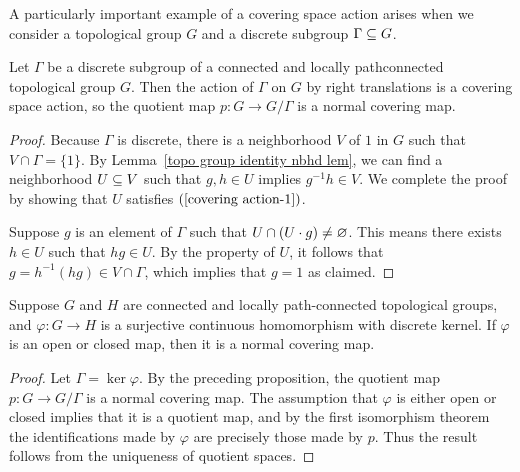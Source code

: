 A particularly important example of a covering space action arises when we consider a topological group $G$ and a discrete subgroup $\Gamma\subseteq G$.
\begin{proposition}
Let $\Gamma$ be a discrete subgroup of a connected and locally pathconnected topological group $G$. Then the action of $\Gamma$ on $G$ by right translations is a covering space action, so the quotient map $p:G\to G/\Gamma$ is a normal covering map.
\end{proposition}
\begin{proof}
Because $\Gamma$ is discrete, there is a neighborhood $V$ of $1$ in $G$ 
such that $V\cap\Gamma=\{1\}$. By Lemma~\ref{topo group identity nbhd lem}, 
we can find a neighborhood $U\subseteq V$ such that $g,h\in U$ implies 
$g^{-1}h\in V$. We complete the proof by showing that $U$ satisfies
$(\ref{covering action-1})$.\par
Suppose $g$ is an element of $\Gamma$ such that $U\cap (U\cdot g)\neq\varnothing$. 
This means there exists $h\in U$ such that $hg\in U$. By the property of $U$, 
it follows that $g=h^{-1}(hg)\in V\cap\Gamma$, which implies that $g=1$ as 
claimed.
\end{proof}
\begin{corollary}\label{subgroup cover}
Suppose $G$ and $H$ are connected and locally path-connected topological groups, and $\varphi:G\to H$ is a surjective continuous homomorphism with discrete kernel. If $\varphi$ is an open or closed map, then it is a normal covering map.
\end{corollary}
\begin{proof}
Let $\Gamma=\ker\varphi$. By the preceding proposition, the quotient map $p:G\to G/\Gamma$ is a normal covering map. The assumption that $\varphi$ is either open or closed implies that it is a quotient map, and by the first isomorphism theorem the identifications made by $\varphi$ are precisely those made by $p$. Thus the result follows from the uniqueness of quotient spaces.
\end{proof}
